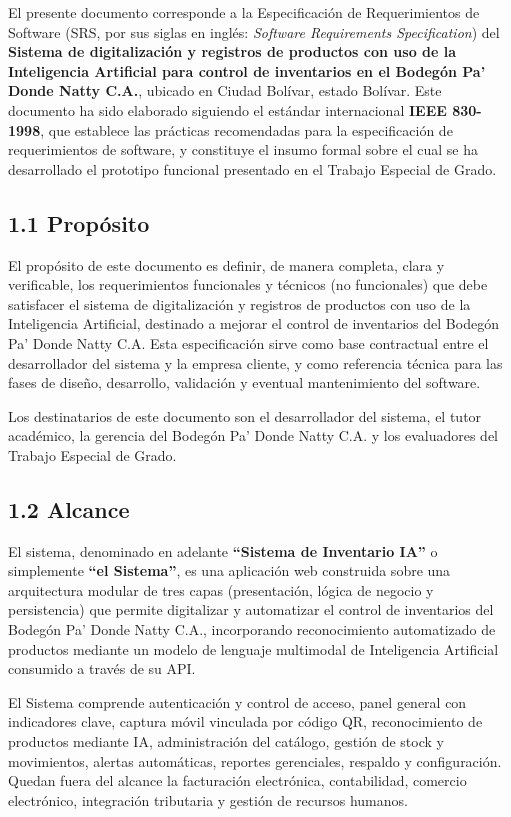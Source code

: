 \documentclass[12pt, letterpaper]{report}
\begin{document}
El presente documento corresponde a la Especificación de Requerimientos
de Software (SRS, por sus siglas en inglés: \textit{Software
Requirements Specification}) del \textbf{Sistema de digitalización y
registros de productos con uso de la Inteligencia Artificial para
control de inventarios en el Bodegón Pa' Donde Natty C.A.}, ubicado
en Ciudad Bolívar, estado Bolívar. Este documento ha sido elaborado
siguiendo el estándar internacional \textbf{IEEE 830-1998}, que
establece las prácticas recomendadas para la especificación de
requerimientos de software, y constituye el insumo formal sobre el
cual se ha desarrollado el prototipo funcional presentado en el
Trabajo Especial de Grado.

\subsection*{1.1 Propósito}

El propósito de este documento es definir, de manera completa, clara
y verificable, los requerimientos funcionales y técnicos
(no funcionales) que debe satisfacer el sistema de digitalización y
registros de productos con uso de la Inteligencia Artificial,
destinado a mejorar el control de inventarios del Bodegón Pa' Donde
Natty C.A. Esta especificación sirve como base contractual entre el
desarrollador del sistema y la empresa cliente, y como referencia
técnica para las fases de diseño, desarrollo, validación y eventual
mantenimiento del software.

Los destinatarios de este documento son el desarrollador del sistema,
el tutor académico, la gerencia del Bodegón Pa' Donde Natty C.A. y
los evaluadores del Trabajo Especial de Grado.

\subsection*{1.2 Alcance}

El sistema, denominado en adelante \textbf{``Sistema de Inventario IA''}
o simplemente \textbf{``el Sistema''}, es una aplicación web construida
sobre una arquitectura modular de tres capas (presentación, lógica de
negocio y persistencia) que permite digitalizar y automatizar el
control de inventarios del Bodegón Pa' Donde Natty C.A., incorporando
reconocimiento automatizado de productos mediante un modelo de
lenguaje multimodal de Inteligencia Artificial consumido a través de
su API.

El Sistema comprende autenticación y control de acceso, panel general
con indicadores clave, captura móvil vinculada por código QR,
reconocimiento de productos mediante IA, administración del catálogo,
gestión de stock y movimientos, alertas automáticas, reportes
gerenciales, respaldo y configuración. Quedan fuera del alcance la
facturación electrónica, contabilidad, comercio electrónico,
integración tributaria y gestión de recursos humanos.
\end{document}
